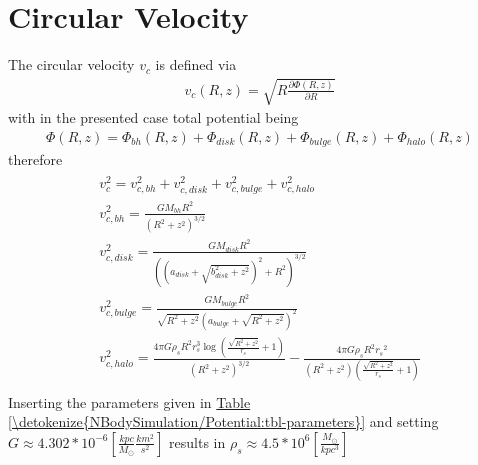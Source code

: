 \documentclass[letterpaper,10pt,english]{sphinxmanual}
\begin{document}
\section{Circular Velocity}
\label{\detokenize{NBodySimulation/Potential:circular-velocity}}
\sphinxAtStartPar
The circular velocity \(v_{c}\) is defined via
\begin{equation}\label{equation:NBodySimulation/Potential:circular_velocity}
\begin{split}v_{c}\left ( R,z \right ) = \sqrt{R\frac{\partial \Phi \left (R,z  \right )}{\partial R}   }\end{split}
\end{equation}
\sphinxAtStartPar
with in the presented case total potential being
\begin{equation}\label{equation:NBodySimulation/Potential:total_potential}
\begin{split}\Phi \left ( R,z \right ) = \Phi_{bh} \left ( R,z \right )+\Phi_{disk} \left ( R,z \right )+\Phi_{bulge} \left ( R,z \right )+\Phi_{halo} \left ( R,z \right )\end{split}
\end{equation}
\sphinxAtStartPar
therefore
\begin{align*}\!\begin{aligned}
v_{c}^{2} = v_{c,bh}^{2}+v_{c,disk}^{2}+v_{c,bulge}^{2}+v_{c,halo}^{2}\\
v_{c,bh}^{2} = \frac{G M_{bh} R^2}{\left(R^2+z^2\right)^{3/2}}\\
v_{c,disk}^{2} = \frac{GM_{disk}R^2}{\left(\left(a_{disk}+\sqrt{b_{disk}^2+z^2}\right)^2+R^2\right)^{3/2}}\\
v_{c,bulge}^{2} = \frac{G M_{bulge} R^2}{\sqrt{R^2+z^2} \left(a_{bulge}+\sqrt{R^2+z^2}\right)^2}\\
v_{c,halo}^{2} = \frac{4 \pi G \rho _{s} R^2 r_{s}^3 \log \left(\frac{\sqrt{R^2+z^2}}{r_{s}}+1\right)}{\left(R^2+z^2\right)^{3/2}}-\frac{4\pi G\rho_{s} R^2 {r_{s}}^2}{\left(R^2+z^2\right) \left(\frac{\sqrt{R^2+z^2}}{r_{s}}+1\right)}\\
\end{aligned}\end{align*}
\sphinxAtStartPar
Inserting the parameters given in \hyperref[\detokenize{NBodySimulation/Potential:tbl-parameters}]{Table \ref{\detokenize{NBodySimulation/Potential:tbl-parameters}}} and setting \(G\approx 4.302*10^{-6}\left [ \frac{kpc}{M_\odot}\frac{km^{2}}{s^{2}} \right ]\) results in \(\rho_{s}\approx 4.5*10^{6} \left [ \frac{M_\odot}{kpc^{3}} \right ]\)
\end{document}

